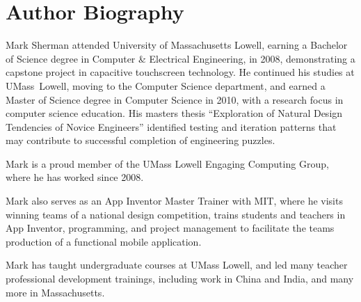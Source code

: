 \chapter{Author Biography}

Mark Sherman attended University of Massachusetts Lowell, earning a  Bachelor of Science degree in Computer \& Electrical Engineering, in 2008, demonstrating a capstone project in capacitive touchscreen technology. He continued his studies at UMass~Lowell, moving to the Computer Science department, and earned a Master of Science degree in Computer Science in 2010, with a research focus in computer science education. His masters thesis ``Exploration of Natural Design Tendencies of Novice Engineers'' identified testing and iteration patterns that may contribute to successful completion of engineering puzzles.

Mark is a proud member of the UMass Lowell Engaging Computing Group, where he has worked since 2008.

Mark also serves as an App Inventor Master Trainer with MIT, where he visits winning teams of a national design competition, trains students and teachers in App Inventor, programming, and project management to facilitate the teams production of a functional mobile application.

Mark has taught undergraduate courses at UMass Lowell, and led many teacher professional development trainings, including work in China and India, and many more in Massachusetts.
